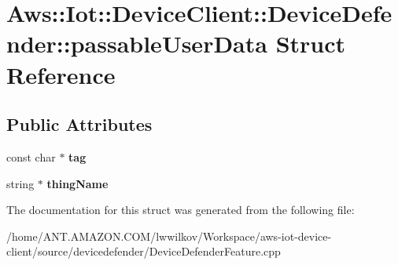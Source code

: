 \hypertarget{struct_aws_1_1_iot_1_1_device_client_1_1_device_defender_1_1passable_user_data}{}\section{Aws\+:\+:Iot\+:\+:Device\+Client\+:\+:Device\+Defender\+:\+:passable\+User\+Data Struct Reference}
\label{struct_aws_1_1_iot_1_1_device_client_1_1_device_defender_1_1passable_user_data}
\subsection*{Public Attributes}
\begin{DoxyCompactItemize}
\item 
\mbox{\label{struct_aws_1_1_iot_1_1_device_client_1_1_device_defender_1_1passable_user_data_aecca4f471f1306340c477fb94817dcf0}} 
const char $\ast$ {\bfseries tag}
\item 
\mbox{\label{struct_aws_1_1_iot_1_1_device_client_1_1_device_defender_1_1passable_user_data_afc91e64c6d2ce0c8ebe3e409a52db30c}} 
string $\ast$ {\bfseries thing\+Name}
\end{DoxyCompactItemize}


The documentation for this struct was generated from the following file\+:\begin{DoxyCompactItemize}
\item 
/home/\+A\+N\+T.\+A\+M\+A\+Z\+O\+N.\+C\+O\+M/lwwilkov/\+Workspace/aws-\/iot-\/device-\/client/source/devicedefender/Device\+Defender\+Feature.\+cpp\end{DoxyCompactItemize}

